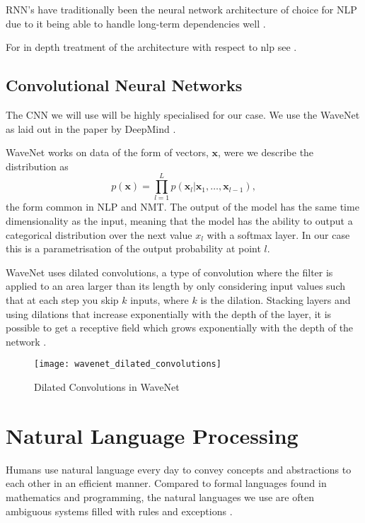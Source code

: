 RNN's have traditionally been the neural network architecture of choice for NLP
due to it being able to handle long-term dependencies well \cite{KarpathyRNN}.



For in depth treatment of the architecture with respect to nlp see \cite{Hochreiter:1997:LSM:1246443.1246450, sundermeyer2012lstm}.

\subsection{Convolutional Neural Networks}
\label{ch:WaveNet}
The CNN we will use will be highly specialised for our case. We use the WaveNet
as laid out in the paper by DeepMind \cite{DBLP:journals/corr/OordDZSVGKSK16}.

WaveNet works on data of the form of vectors, $\bm{x}$, were we describe the distribution as
\begin{equation*}
p(\bm{x}) = \prod_{l=1}^L p(\bm{x}_l| \bm{x}_1, \dots, \bm{x}_{l-1}),
\end{equation*}
the form common in NLP and NMT. The output of the model has the same
time dimensionality as the input, meaning that the model has the ability to
output a categorical distribution over the next value $x_l$ with a softmax
layer. In our case this is a parametrisation of the output probability at point
$l$.

WaveNet uses dilated convolutions, a type of convolution where the filter is applied
to an area larger than its length by only considering input values such that at
each step you skip $k$ inputs, where $k$ is the dilation. Stacking layers and
using dilations that increase exponentially with the depth of the layer, it is
possible to get a receptive field which grows exponentially with the depth of
the network \cite{DBLP:journals/corr/OordDZSVGKSK16}.

\begin{figure}[H]
  \centering
  \texttt{[image: wavenet\_dilated\_convolutions]}
  \caption{Dilated Convolutions in WaveNet \cite{DBLP:journals/corr/OordDZSVGKSK16}}
  \label{fig:wavenet_dilated_convolutions}
\end{figure}

\section{Natural Language Processing}

Humans use natural language every day to convey concepts and abstractions to each
other in an efficient manner. Compared to formal languages found in
mathematics and programming, the natural languages we use are often
ambiguous systems filled with rules and exceptions \cite{Rosenfeld00twodecades, sep-computational-linguistics}.

